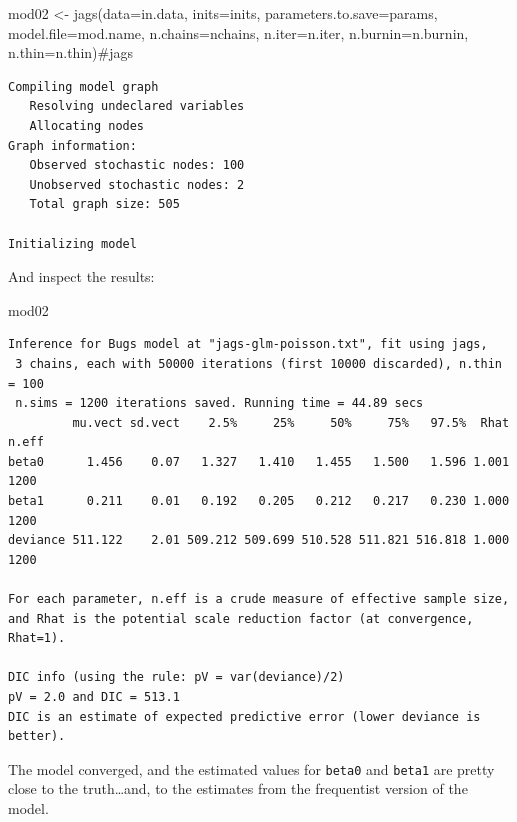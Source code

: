 \documentclass[
  13,
  letterpaper,
]{report}
\newenvironment{Shaded}{\begin{snugshade}}{\end{snugshade}}
\newcommand{\AttributeTok}[1]{\textcolor[rgb]{0.40,0.45,0.13}{#1}}
\newcommand{\CommentTok}[1]{\textcolor[rgb]{0.37,0.37,0.37}{#1}}
\newcommand{\FunctionTok}[1]{\textcolor[rgb]{0.28,0.35,0.67}{#1}}
\newcommand{\NormalTok}[1]{\textcolor[rgb]{0.00,0.23,0.31}{#1}}
\newcommand{\OtherTok}[1]{\textcolor[rgb]{0.00,0.23,0.31}{#1}}
\begin{document}
\begin{Shaded}
\begin{Highlighting}[]
\NormalTok{mod02 }\OtherTok{\textless{}{-}} \FunctionTok{jags}\NormalTok{(}\AttributeTok{data=}\NormalTok{in.data, }\AttributeTok{inits=}\NormalTok{inits,}
              \AttributeTok{parameters.to.save=}\NormalTok{params,}
              \AttributeTok{model.file=}\NormalTok{mod.name,}
              \AttributeTok{n.chains=}\NormalTok{nchains, }\AttributeTok{n.iter=}\NormalTok{n.iter,}
              \AttributeTok{n.burnin=}\NormalTok{n.burnin, }\AttributeTok{n.thin=}\NormalTok{n.thin)}\CommentTok{\#jags}
\end{Highlighting}
\end{Shaded}

\begin{verbatim}
Compiling model graph
   Resolving undeclared variables
   Allocating nodes
Graph information:
   Observed stochastic nodes: 100
   Unobserved stochastic nodes: 2
   Total graph size: 505

Initializing model
\end{verbatim}

And inspect the results:

\begin{Shaded}
\begin{Highlighting}[]
\NormalTok{mod02}
\end{Highlighting}
\end{Shaded}

\begin{verbatim}
Inference for Bugs model at "jags-glm-poisson.txt", fit using jags,
 3 chains, each with 50000 iterations (first 10000 discarded), n.thin = 100
 n.sims = 1200 iterations saved. Running time = 44.89 secs
         mu.vect sd.vect    2.5%     25%     50%     75%   97.5%  Rhat n.eff
beta0      1.456    0.07   1.327   1.410   1.455   1.500   1.596 1.001  1200
beta1      0.211    0.01   0.192   0.205   0.212   0.217   0.230 1.000  1200
deviance 511.122    2.01 509.212 509.699 510.528 511.821 516.818 1.000  1200

For each parameter, n.eff is a crude measure of effective sample size,
and Rhat is the potential scale reduction factor (at convergence, Rhat=1).

DIC info (using the rule: pV = var(deviance)/2)
pV = 2.0 and DIC = 513.1
DIC is an estimate of expected predictive error (lower deviance is better).
\end{verbatim}

The model converged, and the estimated values for \texttt{beta0} and
\texttt{beta1} are pretty close to the truth\ldots and, to the estimates
from the frequentist version of the model.
\end{document}
